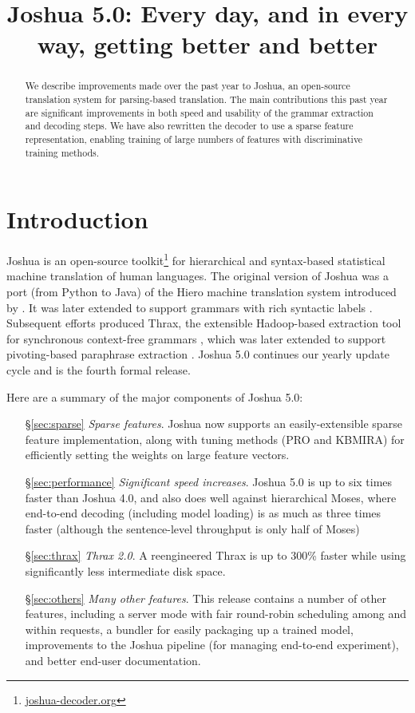 \documentclass[11pt]{article}
\title{Joshua 5.0: Every day, and in every way, getting better and better}
\date{}
\begin{document}
\maketitle

\begin{abstract}
  We describe improvements made over the past year to Joshua, an
  open-source translation system for parsing-based translation. The
  main contributions this past year are significant improvements in
  both speed and usability of the grammar extraction and decoding
  steps. We have also rewritten the decoder to use a sparse feature
  representation, enabling training of large numbers of features with
  discriminative training methods.
\end{abstract}

\section{Introduction}
\label{sec-intro}

Joshua is an open-source toolkit\footnote{\url{joshua-decoder.org}}
for hierarchical and syntax-based statistical machine translation of
human languages.  The original version of Joshua \cite{Joshua-WMT} was
a port (from Python to Java) of the Hiero machine translation system
introduced by .  It was later extended to support
grammars with rich syntactic labels \cite{li2010joshua}. Subsequent
efforts produced Thrax, the extensible Hadoop-based extraction tool
for synchronous context-free grammars \cite{Joshua-3.0}, which was
later extended to support pivoting-based paraphrase extraction
\cite{Joshua-4.0}. Joshua 5.0 continues our yearly update cycle and is
the fourth formal release.

Here are a summary of the major components of Joshua 5.0:

\begin{itemize}
  \item[\S\ref{sec:sparse}] \emph{Sparse features}. Joshua now supports an
    easily-extensible sparse feature implementation, along with tuning
    methods (PRO and KBMIRA) for efficiently setting the weights on
    large feature vectors.
  \item[\S\ref{sec:performance}] \emph{Significant speed increases}. Joshua 5.0 is up to six
    times faster than Joshua 4.0, and also does well against
    hierarchical Moses, where end-to-end decoding (including model
    loading) is as much as three times faster (although the
    sentence-level throughput is only half of Moses)
  \item[\S\ref{sec:thrax}] \emph{Thrax 2.0}. A reengineered Thrax is up to 300\% faster
    while using significantly less intermediate disk space.
  \item[\S\ref{sec:others}] \emph{Many other features}. This release contains a number of
    other features, including a server mode with fair round-robin
    scheduling among and within requests, a bundler for easily
    packaging up a trained model, improvements to the Joshua pipeline
    (for managing end-to-end experiment), and better end-user
    documentation.
\end{itemize}
\end{document}
